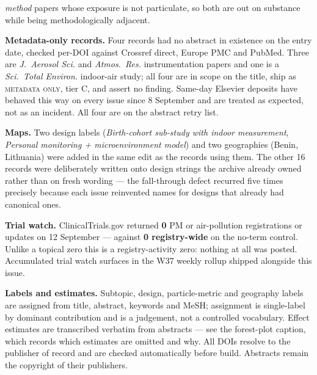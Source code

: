 \documentclass[10pt]{article}
\begin{document}
\begin{keybox}
{\emph{method} papers whose exposure is not particulate, so both are out on substance while
being methodologically adjacent.\par
\vspace{0.8mm}
\textbf{Metadata-only records.} Four records had no abstract in existence on the entry date,
checked per-DOI against Crossref direct, Europe PMC and PubMed. Three are
\textit{J.\ Aerosol Sci.} and \textit{Atmos.\ Res.} instrumentation papers and one is a
\textit{Sci.\ Total Environ.} indoor-air study; all four are in scope on the title, ship as
\textsc{metadata only}, tier C, and assert no finding. Same-day Elsevier deposits have
behaved this way on every issue since 8 September and are treated as expected, not as an
incident. All four are on the abstract retry list.\par
\vspace{0.8mm}
\textbf{Maps.} Two design labels (\textit{Birth-cohort sub-study with indoor measurement},
\textit{Personal monitoring + microenvironment model}) and two geographies (Benin,
Lithuania) were added in the same edit as the records using them. The other 16 records were
deliberately written onto design strings the archive already owned rather than on fresh
wording --- the fall-through defect recurred five times precisely because each issue
reinvented names for designs that already had canonical ones.\par
\vspace{0.8mm}
\textbf{Trial watch.} ClinicalTrials.gov returned \textbf{0} PM or air-pollution
registrations or updates on 12 September --- against \textbf{0 registry-wide} on the
no-term control. Unlike a topical zero this is a registry-activity zero: nothing at all was
posted. Accumulated trial watch surfaces in the W37 weekly rollup shipped alongside this
issue.\par
\vspace{0.8mm}
\textbf{Labels and estimates.} Subtopic, design, particle-metric and geography labels are
assigned from title, abstract, keywords and MeSH; assignment is single-label by dominant
contribution and is a judgement, not a controlled vocabulary. Effect estimates are
transcribed verbatim from abstracts --- see the forest-plot caption, which records which
estimates are omitted and why. All DOIs resolve to the publisher of record and are checked
automatically before build. Abstracts remain the copyright of their publishers.\par}
\end{keybox}
\end{document}
